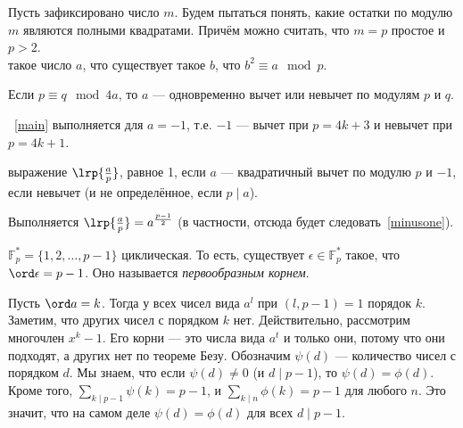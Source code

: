 \documentclass[12pt,a4paper]{article}
\begin{document}


Пусть зафиксировано число $m$. Будем пытаться понять, какие остатки по модулю $m$ являются полными квадратами. Причём можно считать, что $m=p$ простое и $p>2$.\\

 такое число $a$, что существует такое $b$, что $b^2\equiv a\mod p$.

\theorem Если $p\equiv q\mod 4a$, то $a$ --- одновременно вычет или невычет по модулям $p$ и $q$.\label{main}

\lemma~\ref{main} выполняется для $a=-1$, т.е. $-1$ --- вычет при $p=4k+3$ и невычет при $p=4k+1$.\label{minusone}

 выражение $\lrp{\frac{a}{p}} $, равное 1, если $a$ --- квадратичный вычет по модулю $p$ и $-1$, если невычет (и не определённое, если $p\mid a$).

\lemma Выполняется $\lrp{\frac{a}{p}}=a^{\frac{p-1}{2}}$ (в частности, отсюда будет следовать~\ref{minusone}).

\theorem $\mathbb F _p^*=\{1,2,\ldots ,p-1\}$ циклическая. То есть, существует $\epsilon\in \mathbb F _p^*$ такое, что $\ord\epsilon=p-1$. Оно называется \textit{первообразным корнем}.

\proof Пусть $\ord a=k$. Тогда у всех чисел вида $a^l$ при $(l,p-1)=1$ порядок $k$. Заметим, что других чисел с порядком $k$ нет. Действительно, рассмотрим многочлен $x^k-1$. Его корни --- это числа вида $a^t$ и только они, потому что они подходят, а других нет по теореме Безу. Обозначим $\psi(d)$ --- количество чисел с порядком $d$. Мы знаем, что если $\psi(d)\neq 0$ (и $d\mid p-1$), то $\psi(d)=\phi(d)$. Кроме того, $\sum_{k\mid p-1}\psi(k)=p-1$, и $\sum_{k\mid n}\phi(k)=p-1$ для любого $n$. Это значит, что на самом деле $\psi(d)=\phi(d)$ для всех $d\mid p-1$.\QEDA\\
\end{document}

